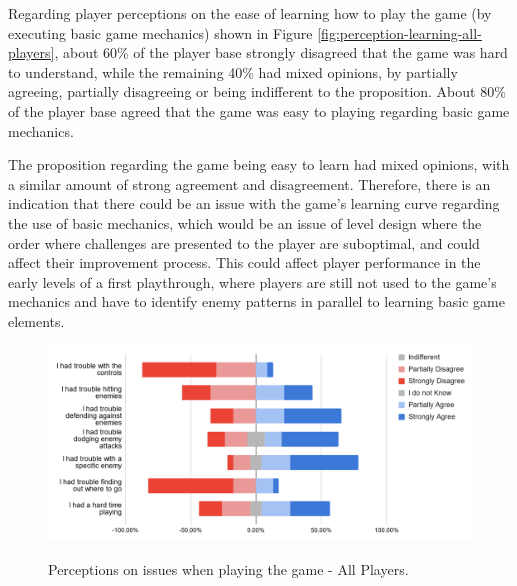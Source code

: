 Regarding player perceptions on the ease of learning how to play the game (by executing basic game mechanics) shown in Figure \ref{fig:perception-learning-all-players}, about 60\% of the player base strongly disagreed that the game was hard to understand, while the remaining 40\% had mixed opinions, by partially agreeing, partially disagreeing or being indifferent to the proposition. About 80\% of the player base agreed that the game was easy to playing regarding basic game mechanics.

The proposition regarding the game being easy to learn had mixed opinions, with a similar amount of strong agreement and disagreement. Therefore, there is an indication that there could be an issue with the game's learning curve regarding the use of basic mechanics, which would be an issue of level design where the order where challenges are presented to the player are suboptimal, and could affect their improvement process. This could affect player performance in the early levels of a first playthrough, where players are still not used to the game's mechanics and have to identify enemy patterns in parallel to learning basic game elements.

\begin{figure}[!ht]
    \begin{center}
    \caption{Perceptions on issues when playing the game - All Players.}
        \includegraphics[width=36em]{figures/fig-perception-troubles-all-players.png}
        \label{fig:perception-troubles-all-players}
    \end{center}
\end{figure}

